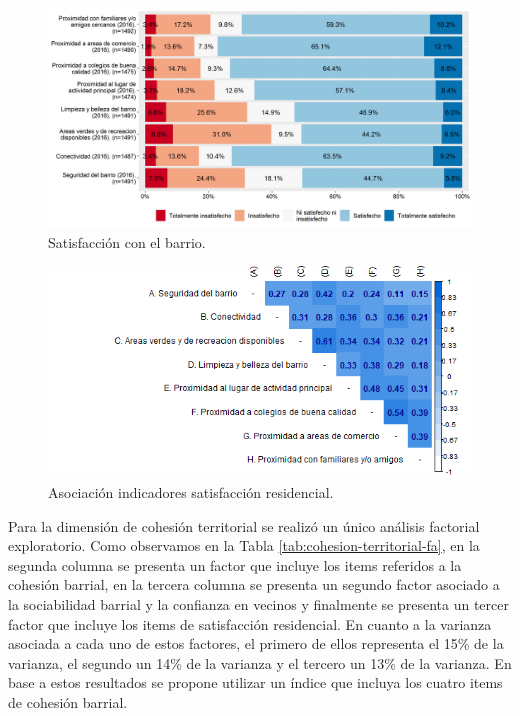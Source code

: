 \documentclass[
  12pt,
]{book}
\begin{document}
\begin{figure}[H]

{\centering \includegraphics[width=1\linewidth,height=1\textheight]{output/graphs/satisfaccion-residencial} 

}

\caption{Satisfacción con el barrio.}\label{fig:satisfaccion-residencial}
\end{figure}

\begin{figure}[H]

{\centering \includegraphics[width=1\linewidth,height=1\textheight]{output/graphs/satisfaccion-residencial_cor} 

}

\caption{Asociación indicadores satisfacción residencial.}\label{fig:satisfaccion-residencial-cor}
\end{figure}

Para la dimensión de cohesión territorial se realizó un único análisis factorial exploratorio. Como observamos en la Tabla \ref{tab:cohesion-territorial-fa}, en la segunda columna se presenta un factor que incluye los items referidos a la cohesión barrial, en la tercera columna se presenta un segundo factor asociado a la sociabilidad barrial y la confianza en vecinos y finalmente se presenta un tercer factor que incluye los items de satisfacción residencial. En cuanto a la varianza asociada a cada uno de estos factores, el primero de ellos representa el 15\% de la varianza, el segundo un 14\% de la varianza y el tercero un 13\% de la varianza. En base a estos resultados se propone utilizar un índice que incluya los cuatro items de cohesión barrial.
\end{document}
